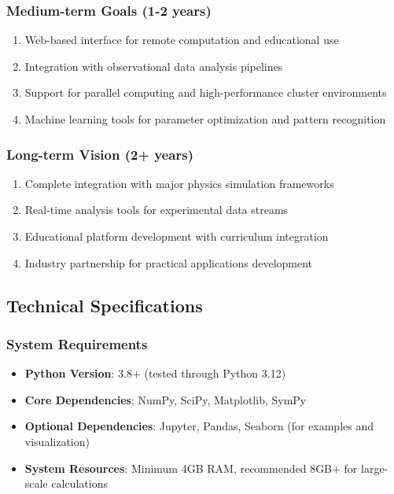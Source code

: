 \subsubsection{Medium-term Goals (1-2 years)}

\begin{enumerate}
\item Web-based interface for remote computation and educational use
\item Integration with observational data analysis pipelines
\item Support for parallel computing and high-performance cluster environments
\item Machine learning tools for parameter optimization and pattern recognition
\end{enumerate}

\subsubsection{Long-term Vision (2+ years)}

\begin{enumerate}
\item Complete integration with major physics simulation frameworks
\item Real-time analysis tools for experimental data streams
\item Educational platform development with curriculum integration
\item Industry partnership for practical applications development
\end{enumerate}

\subsection{Technical Specifications}
\label{subsec:technical_specifications}

\subsubsection{System Requirements}

\begin{itemize}
\item \textbf{Python Version}: 3.8+ (tested through Python 3.12)
\item \textbf{Core Dependencies}: NumPy, SciPy, Matplotlib, SymPy
\item \textbf{Optional Dependencies}: Jupyter, Pandas, Seaborn (for examples and visualization)
\item \textbf{System Resources}: Minimum 4GB RAM, recommended 8GB+ for large-scale calculations
\end{itemize}

